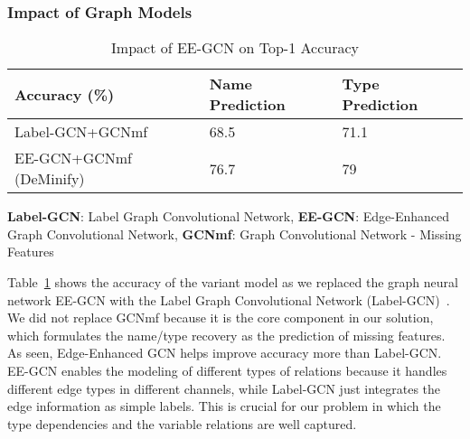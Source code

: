 \subsubsection{Impact of Graph Models}
\label{sec:models}



\begin{table}[!ht]
  \centering
  \tabcolsep 2.5pt
    \begin{tabular}{|l|l|l|}
    \hline
        Accuracy (\%) & Name Prediction & Type Prediction\\ \hline
        Label-GCN+GCNmf & 68.5 & 71.1 \\ \hline
        EE-GCN+GCNmf (DeMinify) & 76.7 & 79 \\ \hline
    \end{tabular}
    {\bf Label-GCN}: Label Graph Convolutional Network, {\bf EE-GCN}: Edge-Enhanced Graph Convolutional Network, {\bf GCNmf}: Graph Convolutional Network - Missing Features
    \caption{Impact of EE-GCN on Top-1 Accuracy}
    \label{tab:sensi-graph}
\end{table}

Table~\ref{tab:sensi-graph} shows the accuracy of the variant model
as we replaced the graph neural network EE-GCN with the Label Graph
Convolutional Network (Label-GCN)~\cite{label-gcn}. We did not replace
GCNmf because it is the core component in our solution, which
formulates the name/type recovery as the prediction of missing
features. As seen, Edge-Enhanced GCN helps improve accuracy more than
Label-GCN. EE-GCN enables the modeling of different types of relations
because it handles different edge types in different channels, while
Label-GCN just integrates the edge information as simple labels.
This is crucial for our problem in which the type dependencies
and the variable relations are well captured.


